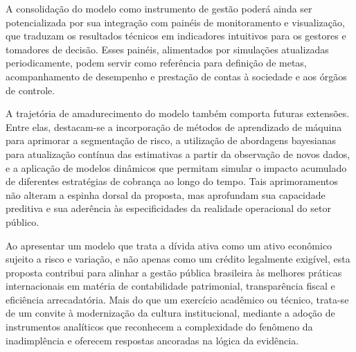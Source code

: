 \documentclass[a4paper,12pt]{article}
\begin{document}
A consolidação do modelo como instrumento de gestão poderá ainda ser potencializada por sua integração com painéis de monitoramento e visualização, que traduzam os resultados técnicos em indicadores intuitivos para os gestores e tomadores de decisão. Esses painéis, alimentados por simulações atualizadas periodicamente, podem servir como referência para definição de metas, acompanhamento de desempenho e prestação de contas à sociedade e aos órgãos de controle.

A trajetória de amadurecimento do modelo também comporta futuras extensões. Entre elas, destacam-se a incorporação de métodos de aprendizado de máquina para aprimorar a segmentação de risco, a utilização de abordagens bayesianas para atualização contínua das estimativas a partir da observação de novos dados, e a aplicação de modelos dinâmicos que permitam simular o impacto acumulado de diferentes estratégias de cobrança ao longo do tempo. Tais aprimoramentos não alteram a espinha dorsal da proposta, mas aprofundam sua capacidade preditiva e sua aderência às especificidades da realidade operacional do setor público.

Ao apresentar um modelo que trata a dívida ativa como um ativo econômico sujeito a risco e variação, e não apenas como um crédito legalmente exigível, esta proposta contribui para alinhar a gestão pública brasileira às melhores práticas internacionais em matéria de contabilidade patrimonial, transparência fiscal e eficiência arrecadatória. Mais do que um exercício acadêmico ou técnico, trata-se de um convite à modernização da cultura institucional, mediante a adoção de instrumentos analíticos que reconhecem a complexidade do fenômeno da inadimplência e oferecem respostas ancoradas na lógica da evidência.

\newpage


\end{document}
